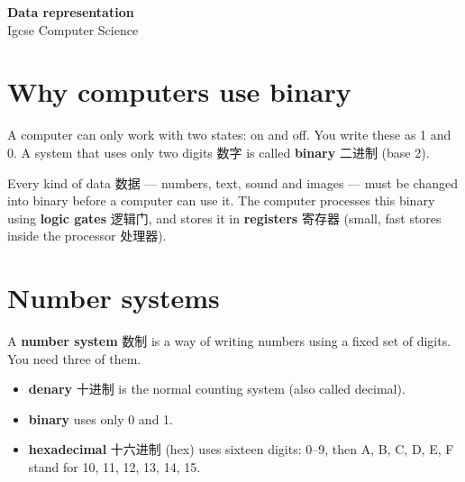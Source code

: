\documentclass[11pt]{article}
\begin{document}
\begin{center}
  {\LARGE\bfseries Data representation}\\[0.35em]
  {\large Igcse Computer Science}
\end{center}
\vspace{0.6em}

\section*{Why computers use binary}

A computer can only work with two states: on and off. You write these as 1 and 0. A system that uses only two digits 数字 is called \textbf{binary} 二进制 (base 2).

Every kind of data 数据 — numbers, text, sound and images — must be changed into binary before a computer can use it. The computer processes this binary using \textbf{logic gates} 逻辑门, and stores it in \textbf{registers} 寄存器 (small, fast stores inside the processor 处理器).

\section*{Number systems}

A \textbf{number system} 数制 is a way of writing numbers using a fixed set of digits. You need three of them.

\begin{center}
\end{center}

\begin{itemize}
\item \textbf{denary} 十进制 is the normal counting system (also called decimal).

\item \textbf{binary} uses only 0 and 1.

\item \textbf{hexadecimal} 十六进制 (hex) uses sixteen digits: 0–9, then A, B, C, D, E, F stand for 10, 11, 12, 13, 14, 15.

\end{itemize}
\end{document}
